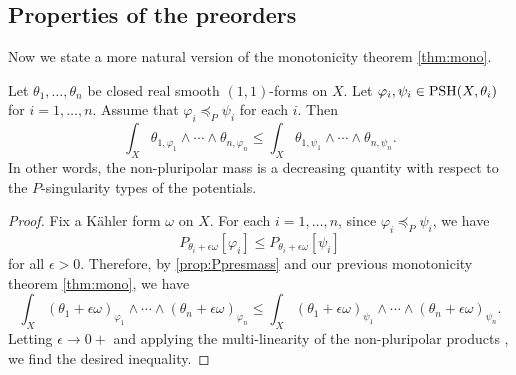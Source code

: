 \subsection{Properties of the preorders}
\label{subsec:preorder_prop}

Now we state a more natural version of the monotonicity theorem \cref{thm:mono}.
\begin{proposition}\label{prop:mono2}
    Let $\theta_1,\ldots,\theta_n$ be closed real smooth $(1,1)$-forms on $X$.
    Let $\varphi_i,\psi_i\in \mathrm{PSH}(X,\theta_i)$ for $i=1,\ldots,n$. Assume that $\varphi_i\preceq_P \psi_i$ for each $i$. Then
    \[
        \int_X \theta_{1,\varphi_1}\wedge \cdots \wedge  \theta_{n,\varphi_n}\leq \int_X \theta_{1,\psi_1}\wedge \cdots \wedge  \theta_{n,\psi_n}.
    \]
    In other words, the non-pluripolar mass is a decreasing quantity with respect to the $P$-singularity types of the potentials.
\end{proposition}
\begin{proof}
    Fix a Kähler form $\omega$ on $X$. For each $i=1,\ldots,n$, since $\varphi_i\preceq_P\psi_i$, we have
    \[
        P_{\theta_i+\epsilon\omega}[\varphi_i]\leq P_{\theta_i+\epsilon\omega}[\psi_i]
    \]
    for all $\epsilon>0$. Therefore, by \cref{prop:Ppresmass} and our previous monotonicity theorem \cref{thm:mono}, we have
    \[
        \int_X (\theta_1+\epsilon\omega)_{\varphi_1}\wedge \cdots \wedge (\theta_n+\epsilon\omega)_{\varphi_n}\leq \int_X (\theta_1+\epsilon\omega)_{\psi_1}\wedge \cdots \wedge (\theta_n+\epsilon\omega)_{\psi_n}.
    \]
    Letting $\epsilon\to 0+$ and applying the multi-linearity of the non-pluripolar products , we find the desired inequality.
\end{proof}


